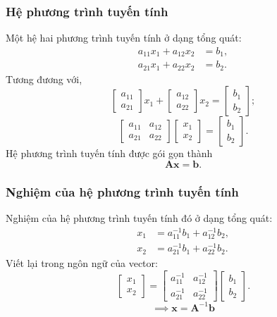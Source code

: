 \begin{frame}
    \frametitle{Hệ phương trình tuyến tính}
    Một hệ hai phương trình tuyến tính ở dạng tổng quát:
\begin{align*}
a_{11}x_{1} + a_{12}x_{2} &= b_{1}, \\
a_{21}x_{1} + a_{22}x_{2} &= b_{2}.
\end{align*}
Tương đương với,
\[\begin{bmatrix}
    a_{11}\\a_{21}
\end{bmatrix}x_{1}+\begin{bmatrix}
    a_{12}\\a_{22}
\end{bmatrix}x_{2}=\begin{bmatrix}
    b_{1}\\b_{2}
\end{bmatrix};\]
\[\begin{bmatrix}
    a_{11}&a_{12}\\
    a_{21}&a_{22}
\end{bmatrix}\begin{bmatrix}
    x_{1}\\x_{2}
\end{bmatrix}=\begin{bmatrix}
    b_{1}\\b_{2}
\end{bmatrix}.\]
Hệ phương trình tuyến tính được gói gọn thành 
\[\mathbf{A}\mathbf{x}=\mathbf{b}.\]
\end{frame}
\begin{frame}
    \frametitle{Nghiệm của hệ phương trình tuyến tính}
    Nghiệm của hệ phương trình tuyến tính đó ở dạng tổng quát:
    \begin{align*}
x_{1} &= a_{11}^{-1}b_{1} + a_{12}^{-1}b_{2}, \\
x_{2} &= a_{21}^{-1}b_{1} + a_{22}^{-1}b_{2}.
\end{align*}
Viết lại trong ngôn ngữ của vector:
\[\begin{bmatrix}
    x_{1}\\x_{2}
\end{bmatrix}=\begin{bmatrix}
    a_{11}^{-1}&a_{12}^{-1}\\
    a_{21}^{-1}&a_{22}^{-1}
\end{bmatrix}\begin{bmatrix}
    b_{1}\\b_{2}
\end{bmatrix}.\]
\[\implies \mathbf{x}=\mathbf{A}^{-1}\mathbf{b}\]
\end{frame}
